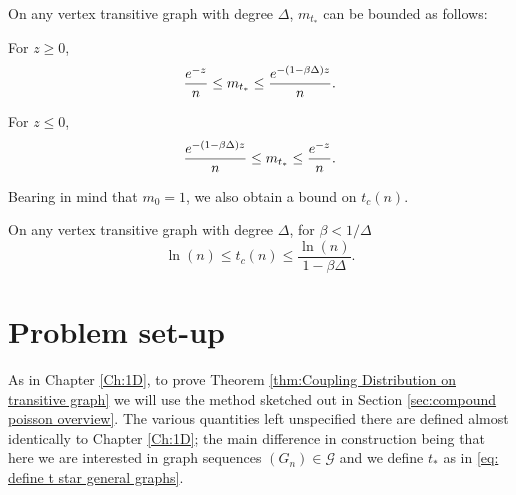 \begin{corollary}
\label{cor:magnetization of t star}
	On any vertex transitive graph with degree $\Delta$, $m_{t_*}$ can be bounded as follows:

	For $z \geq 0$,
	\begin{equation}
		\frac{e^{-z}}{n} \leq m_{t_*} \leq \frac{e^{-(1 - \beta \Delta)z}}{n}.
	\end{equation}

	For $z \leq 0$,
	\begin{equation}
		 \frac{e^{-(1 - \beta \Delta)z}}{n} \leq m_{t_*} \leq \frac{e^{-z}}{n}.
	\end{equation}
\end{corollary}
Bearing in mind that $m_0 = 1$, we also obtain a bound on $t_c(n)$.
\begin{corollary}
\label{cor:bound t_c(n)}
	On any vertex transitive graph with degree $\Delta$, for $\beta < 1/\Delta$
	\begin{equation}
		\ln(n) \leq t_c(n) \leq \frac{\ln(n)}{1 - \beta \Delta}.
	\end{equation}
\end{corollary}

\section{Problem set-up}
\label{sec:nd problem setup}
As in Chapter \ref{Ch:1D}, to prove Theorem \ref{thm:Coupling Distribution on transitive graph} we will use the method sketched out in Section \ref{sec:compound poisson overview}. The various quantities left unspecified there are defined almost identically to Chapter \ref{Ch:1D}; the main difference in construction being that here we are interested in graph sequences $(G_n) \in \mathscr{G}$ and we define $t_*$ as in \eqref{eq: define t star general graphs}.


